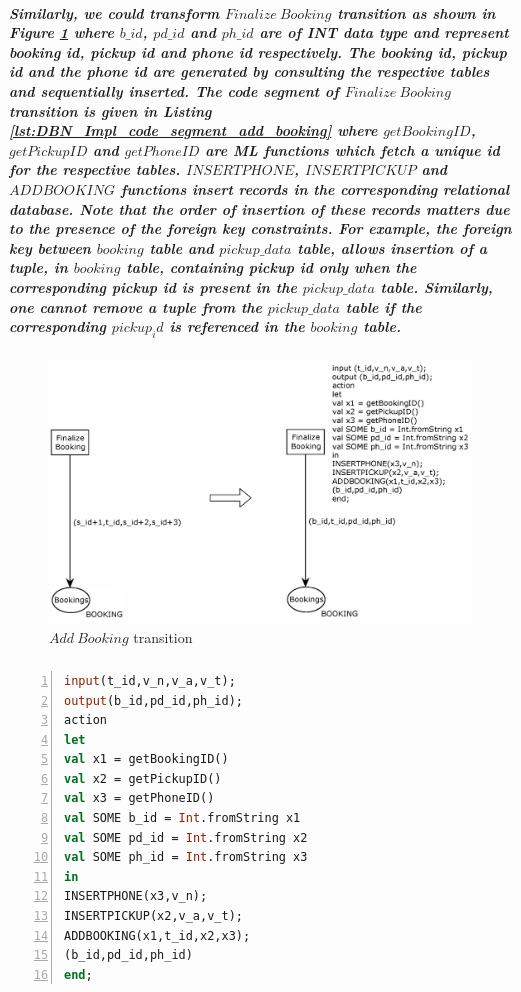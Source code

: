 \subparagraph*{\textnormal{Similarly, we could transform $\mathit{Finalize\ Booking}$ transition as shown in Figure \ref{fig:DBN_Impl_Finalize_Booking} where $\mathit{b\_id}$, $\mathit{pd\_id}$ and $\mathit{ph\_id}$ are of \textit{INT} data type and represent booking id, pickup id and phone id respectively. The booking id, pickup id and the phone id are generated by consulting the respective tables and sequentially inserted. The code segment of $\mathit{Finalize\ Booking}$ transition is given in Listing \ref{lst:DBN_Impl_code_segment_add_booking} where $\mathit{getBookingID}$, $\mathit{getPickupID}$ and $\mathit{getPhoneID}$ are ML functions which fetch a unique id for the respective tables. $\mathit{INSERTPHONE}$, $\mathit{INSERTPICKUP}$ and $\mathit{ADDBOOKING}$ functions insert records in the corresponding relational database. Note that the order of insertion of these records matters due to the presence of the foreign key constraints. For example, the foreign key between $\mathit{booking}$ table and $\mathit{pickup\_data}$ table, allows insertion of a tuple, in $\mathit{booking}$ table, containing pickup id only when the corresponding pickup id is present in the $\mathit{pickup\_data}$ table. Similarly, one cannot remove a tuple from the $\mathit{pickup\_data}$ table if the corresponding $\mathit{pickup_id}$ is referenced in the $\mathit{booking}$ table.}}

\begin{figure}[!htbp]
	\centering
	\includegraphics[scale = 0.35]{DBN_Impl_Finalize_Booking.pdf}
	\caption{$\mathit{Add\ Booking}$ transition}
	\label{fig:DBN_Impl_Finalize_Booking}
\end{figure}

\subparagraph*{}
\begin{lstlisting}[showstringspaces=false, language = ML, caption = code segment of transition : $\mathit{Finalize\ Booking}$, captionpos=b, label = lst:DBN_Impl_code_segment_add_booking, numbers=left,
stepnumber=1]
input(t_id,v_n,v_a,v_t);
output(b_id,pd_id,ph_id);
action
let
val x1 = getBookingID()
val x2 = getPickupID()
val x3 = getPhoneID()
val SOME b_id = Int.fromString x1
val SOME pd_id = Int.fromString x2
val SOME ph_id = Int.fromString x3
in
INSERTPHONE(x3,v_n);
INSERTPICKUP(x2,v_a,v_t);
ADDBOOKING(x1,t_id,x2,x3);
(b_id,pd_id,ph_id)
end;
\end{lstlisting}

